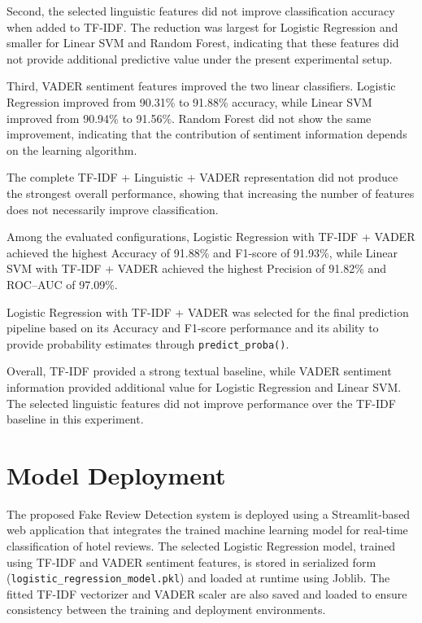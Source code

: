 \documentclass[12pt,a4paper]{report}
\begin{document}
Second, the selected linguistic features did not improve
classification accuracy when added to TF-IDF. The reduction was
largest for Logistic Regression and smaller for Linear SVM and Random
Forest, indicating that these features did not provide additional
predictive value under the present experimental setup.

Third, VADER sentiment features improved the two linear classifiers.
Logistic Regression improved from 90.31\% to 91.88\% accuracy, while
Linear SVM improved from 90.94\% to 91.56\%. Random Forest did not
show the same improvement, indicating that the contribution of
sentiment information depends on the learning algorithm.

The complete TF-IDF + Linguistic + VADER representation did not
produce the strongest overall performance, showing that increasing
the number of features does not necessarily improve classification.

Among the evaluated configurations, Logistic Regression with
TF-IDF + VADER achieved the highest Accuracy of 91.88\% and F1-score
of 91.93\%, while Linear SVM with TF-IDF + VADER achieved the highest
Precision of 91.82\% and ROC--AUC of 97.09\%.

Logistic Regression with TF-IDF + VADER was selected for the final
prediction pipeline based on its Accuracy and F1-score performance and
its ability to provide probability estimates through
\texttt{predict\_proba()}.

Overall, TF-IDF provided a strong textual baseline, while VADER
sentiment information provided additional value for Logistic
Regression and Linear SVM. The selected linguistic features did not
improve performance over the TF-IDF baseline in this experiment.

\newpage

\chapter{Model Deployment}

The proposed Fake Review Detection system is deployed using a
Streamlit-based web application that integrates the trained machine
learning model for real-time classification of hotel reviews.
The selected Logistic Regression model, trained using TF-IDF
and VADER sentiment features, is stored in serialized form
(\texttt{logistic\_regression\_model.pkl}) and loaded at runtime
using Joblib. The fitted TF-IDF vectorizer and VADER scaler
are also saved and loaded to ensure consistency between
the training and deployment environments.
\end{document}

